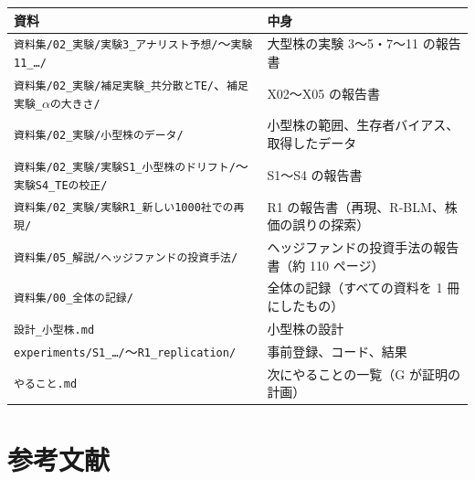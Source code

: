 \documentclass[xelatex,ja=standard,jafont=haranoaji,a4paper,10pt]{bxjsreport}
\newcommand{\code}[1]{\texttt{#1}}
\begin{document}
\begin{longtable}{p{6.4cm}p{7.6cm}}
\toprule
\textbf{資料} & \textbf{中身} \\
\midrule
\endfirsthead
\bottomrule
\endfoot
\code{資料集/02\_実験/実験3\_アナリスト予想/}〜\code{実験11\_…/} & 大型株の実験 3〜5・7〜11 の報告書 \\
\code{資料集/02\_実験/補足実験\_共分散とTE/}、\code{補足実験\_}$\alpha$\code{の大きさ/} & X02〜X05 の報告書 \\
\code{資料集/02\_実験/小型株のデータ/} & 小型株の範囲、生存者バイアス、取得したデータ \\
\code{資料集/02\_実験/実験S1\_小型株のドリフト/}〜\code{実験S4\_TEの校正/} & S1〜S4 の報告書 \\
\code{資料集/02\_実験/実験R1\_新しい1000社での再現/} & R1 の報告書（再現、R-BLM、株価の誤りの探索） \\
\code{資料集/05\_解説/ヘッジファンドの投資手法/} & ヘッジファンドの投資手法の報告書（約 110 ページ） \\
\code{資料集/00\_全体の記録/} & 全体の記録（すべての資料を 1 冊にしたもの） \\
\code{設計\_小型株.md} & 小型株の設計 \\
\code{experiments/S1\_…/}〜\code{R1\_replication/} & 事前登録、コード、結果 \\
\code{やること.md} & 次にやることの一覧（G が証明の計画） \\
\end{longtable}

\chapter*{参考文献}
\end{document}
